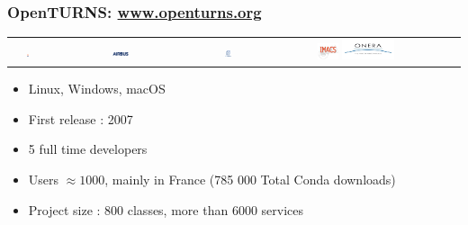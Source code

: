\documentclass{beamer}
\begin{document}
    \begin{frame}
    \frametitle{OpenTURNS: \url{www.openturns.org}}

    \begin{center}
       \begin{tabular}{ccccc}
       \includegraphics[width=0.07\textwidth]{figures/logoEDF_Anne.png}&
       \includegraphics[width=0.12\textwidth]{figures/LogoAirbus.png}&
       \includegraphics[width=0.12\textwidth]{figures/logo_phimeca.png}&
       \includegraphics[width=0.12\textwidth]{figures/logo_Imacs.png}
       \includegraphics[width=0.30\textwidth]{figures/logo_ONERA.jpg}&
       \end{tabular}
    \end{center}

    \vspace*{0.05cm}
    \begin{itemize}
    \item Linux, Windows, macOS
    \item First release : 2007
    \item 5 full time developers
    \item Users $\approx 1000$, mainly in France
    (785 000 Total Conda downloads)
    \item Project size : 800  classes, more than 6000 services
    \end{itemize}


    \end{frame}

\end{document}
